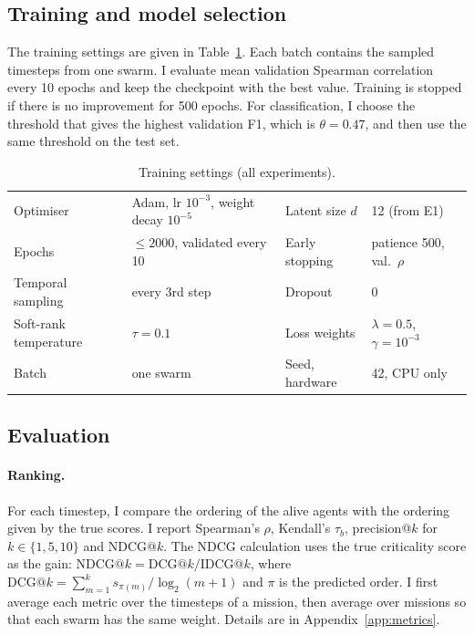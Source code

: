 \documentclass[11pt,a4paper]{article}
\begin{document}
\subsection{Training and model selection}
The training settings are given in Table~\ref{tab:train}. Each batch contains the sampled timesteps from one
swarm. I evaluate mean validation Spearman correlation every 10 epochs and keep the checkpoint with the best value.
Training is stopped if there is no improvement for 500 epochs. For classification, I choose the threshold that
gives the highest validation F1, which is $\theta=0.47$, and then use the same threshold on the test set.

\begin{table}[!htbp]\centering\small
\caption{Training settings (all experiments).}\label{tab:train}
\begin{tabular}{@{}ll@{\hskip 0.5cm}ll@{}}\toprule
Optimiser & Adam, lr $10^{-3}$, weight decay $10^{-5}$ & Latent size $d$ & 12 (from E1)\\
Epochs & $\le2000$, validated every 10 & Early stopping & patience 500, val.\ $\rho$\\
Temporal sampling & every 3rd step & Dropout & 0\\
Soft-rank temperature & $\tau=0.1$ & Loss weights & $\lambda=0.5$, $\gamma=10^{-3}$\\
Batch & one swarm & Seed, hardware & 42, CPU only\\\bottomrule
\end{tabular}
\end{table}

\subsection{Evaluation}
\paragraph{Ranking.} For each timestep, I compare the ordering of the alive agents with the ordering given by
the true scores. I report Spearman's $\rho$, Kendall's $\tau_b$, precision@$k$ for $k\in\{1,5,10\}$ and NDCG@$k$.
The NDCG calculation uses the true criticality score as the gain:
$\mathrm{NDCG}@k=\mathrm{DCG}@k/\mathrm{IDCG}@k$, where
$\mathrm{DCG}@k=\sum_{m=1}^{k}s_{\pi(m)}/\log_2(m+1)$ and $\pi$ is the predicted order.
I first average each metric over the timesteps of a mission, then average over missions so that each swarm has
the same weight. Details are in Appendix~\ref{app:metrics}.
\end{document}
